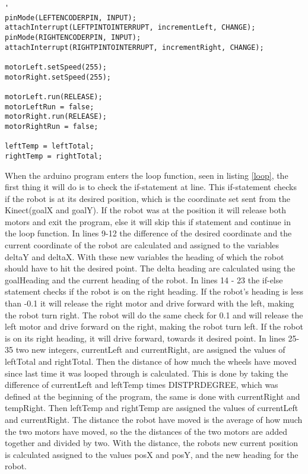 \begin{lstlisting}[caption={The setup function}, label={setup}]'
pinMode(LEFTENCODERPIN, INPUT);
attachInterrupt(LEFTPINTOINTERRUPT, incrementLeft, CHANGE);
pinMode(RIGHTENCODERPIN, INPUT);
attachInterrupt(RIGHTPINTOINTERRUPT, incrementRight, CHANGE);

motorLeft.setSpeed(255);
motorRight.setSpeed(255);

motorLeft.run(RELEASE);
motorLeftRun = false;
motorRight.run(RELEASE);
motorRightRun = false;

leftTemp = leftTotal;
rightTemp = rightTotal;
\end{lstlisting}

When the arduino program enters the loop function, seen in listing \ref{loop}, the first thing it will do is to check the if-statement at line. This if-statement checks if the robot is at its desired position, which is the coordinate set sent from the Kinect(goalX and goalY). If the robot was at the position it will release both motors and exit the program, else it will skip this if statement and continue in the loop function. \newline
In lines 9-12 the difference of the desired coordinate and the current coordinate of the robot are calculated and assigned to the variables deltaY and deltaX. With these new variables the heading of which the robot should have to hit the desired point. The delta heading are calculated using the goalHeading and the current heading of the robot.\newline
In lines 14 - 23 the if-else statement checks if the robot is on the right heading. If the robot's heading is less than -0.1 it will release the right motor and drive forward with the left, making the robot turn right. The robot will do the same check for 0.1 and will release the left motor and drive forward on the right, making the robot turn left. If the robot is on its right heading, it will drive forward, towards it desired point. \newline
In lines 25-35 two new integers, currentLeft and currentRight, are assigned the values of leftTotal and rightTotal. Then the distance of how much the wheels have moved since last time it was looped through is calculated. This is done by taking the difference of currentLeft and leftTemp times DISTPRDEGREE, which was defined at the beginning of the program, the same is done with currentRight and tempRight. Then leftTemp and rightTemp are assigned the values of currentLeft and currentRight. \newline
The distance the robot have moved is the average of how much the two motors have moved, so the the distances of the two motors are added together and divided by two. With the distance, the robots new current position is calculated assigned to the values posX and posY, and the new heading for the robot.
 

